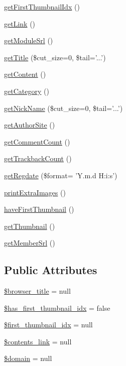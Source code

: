 \begin{DoxyCompactItemize}
\item 
\hyperlink{classcontentItem_a0de8d1dad2347b9f91bc4f16df2c4a12}{get\-First\-Thumbnail\-Idx} ()
\item 
\hyperlink{classcontentItem_a8e5d8c09bab20f5a0cd0874504cf5a5e}{get\-Link} ()
\item 
\hyperlink{classcontentItem_a62686ab7afb76f1239a3824be0e2ded8}{get\-Module\-Srl} ()
\item 
\hyperlink{classcontentItem_aa061be1a76a2d94912440572bd4f875a}{get\-Title} (\$cut\-\_\-size=0, \$tail='...')
\item 
\hyperlink{classcontentItem_adb35fd4206e162bccd6ff9f5ac832e09}{get\-Content} ()
\item 
\hyperlink{classcontentItem_ae5a4e97f8f472805fff31340bc095ff3}{get\-Category} ()
\item 
\hyperlink{classcontentItem_a16947acbbeff208471271acd16d5f8f1}{get\-Nick\-Name} (\$cut\-\_\-size=0, \$tail='...')
\item 
\hyperlink{classcontentItem_ac8050edaeafe9d6a9c3017185a60576d}{get\-Author\-Site} ()
\item 
\hyperlink{classcontentItem_ae2402a7138ef2a2c9dae2d76aa31228f}{get\-Comment\-Count} ()
\item 
\hyperlink{classcontentItem_a197f56732733f1487d26ed23d29e94a6}{get\-Trackback\-Count} ()
\item 
\hyperlink{classcontentItem_a16a589406fd0206a40ec96810ec75ec1}{get\-Regdate} (\$format= 'Y.\-m.\-d H\-:i\-:s')
\item 
\hyperlink{classcontentItem_acdff242f3298021a7ac9274a4191ebc7}{print\-Extra\-Images} ()
\item 
\hyperlink{classcontentItem_a9e7fa4b2b4b3ce4a066d89b7f862be5a}{have\-First\-Thumbnail} ()
\item 
\hyperlink{classcontentItem_a2d0ac2755de034bee02842e1b4b8179c}{get\-Thumbnail} ()
\item 
\hyperlink{classcontentItem_a3356fefc2abd34642fa229f5a150cbdd}{get\-Member\-Srl} ()
\end{DoxyCompactItemize}
\subsection*{Public Attributes}
\begin{DoxyCompactItemize}
\item 
\hyperlink{classcontentItem_abaf3b2f2d6878f8568161f4fce4e80bf}{\$browser\-\_\-title} = null
\item 
\hyperlink{classcontentItem_a78da7867160d34bf7e422524f6a78c37}{\$has\-\_\-first\-\_\-thumbnail\-\_\-idx} = false
\item 
\hyperlink{classcontentItem_a3ed95afadefbe20bd085e1d88220f4b1}{\$first\-\_\-thumbnail\-\_\-idx} = null
\item 
\hyperlink{classcontentItem_a6bf076b1d98025ee3f1d847fcf1fd29f}{\$contents\-\_\-link} = null
\item 
\hyperlink{classcontentItem_a428d40bc2148eae5661822963ba819b4}{\$domain} = null
\end{DoxyCompactItemize}


